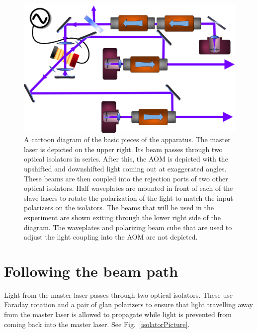 \begin{figure}
    \centerline{\includegraphics[width=1\textwidth]{diagramOfSetup3}}
    \caption[Diagram of the Setup]{\label{diagramOfSetup3}
	A cartoon diagram of the basic pieces of the apparatus. The master laser is depicted on the upper right. Its beam passes through two optical isolators in series. After this, the AOM is depicted with the upshifted and downshifted light coming out at exaggerated angles. These beams are then coupled into the rejection ports of two other optical isolators. Half waveplates are mounted in front of each of the slave lasers to rotate the polarization of the light to match the input polarizers on the isolators. The beams that will be used in the experiment are shown exiting through the lower right side of the diagram. The waveplates and polarizing beam cube that are used to adjust the light coupling into the AOM are not depicted.
    }
\end{figure}
\section{Following the beam path}
Light from the master laser passes through two optical isolators. These use Faraday rotation and a pair of glan polarizers to ensure that light travelling away from the master laser is allowed to propagate while light is prevented from coming back into the master laser. See Fig.~\ref{isolatorPicture}.

